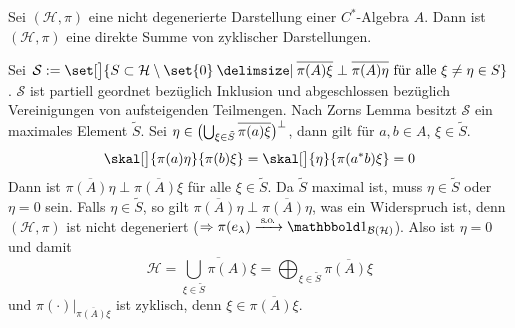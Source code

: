 \begin{satz}[{name=[Darstellung als direkte Summe]}]
	Sei $(\mathcal{H},\pi)$ eine nicht degenerierte Darstellung einer $C^*$-Algebra $A$.
	Dann ist $(\mathcal{H},\pi)$ eine direkte Summe von zyklischer Darstellungen.
\end{satz}
\begin{beweis}
	Sei $\mathcal{S} := \set[\big]{S \subset \mathcal{H}\setminus \set{0} \given {\overline{\pi(A) \xi}} \perp {\overline{\pi(A)\eta}} \text{ für alle }\xi \neq \eta \in S }$.
	$\mathcal{S}$ ist partiell geordnet bezüglich Inklusion und abgeschlossen bezüglich Vereinigungen von aufsteigenden Teilmengen.
	Nach Zorns Lemma besitzt $\mathcal{S}$ ein maximales Element $\tilde{S}$.
	Sei $\eta \in \enbrace[\big]{\bigcup_{\xi \in \tilde{S}} \overline{\pi(a)\xi}}^\bot$, dann gilt für $a,b \in A$, $\xi \in \tilde{S}$.
	\[
		\skal[\big]{\pi(a) \eta}{\pi(b)\xi} = \skal[\big]{\eta}{ \pi(a^*b)\xi} =0
	\]
	Dann ist $\overline{\pi(A)\eta} \perp \overline{\pi(A)\xi}$ für alle $\xi \in \tilde{S}$.
	Da $\tilde{S}$ maximal ist, muss $\eta \in \tilde{S}$ oder $\eta=0$ sein.
	Falls $\eta \in \tilde{S}$, so gilt $\overline{\pi(A)\eta}\perp \overline{\pi(A)\eta}$, was ein Widerspruch ist, denn $(\mathcal{H},\pi)$ ist nicht degeneriert ($\Rightarrow  \pi(e_\lambda)\grenzw{\so}\ind_{\mathcal{B}(\mathcal{H})}$).
	Also ist $\eta=0$ und damit
	\[
		\mathcal{H}= \overline{\bigcup_{\xi \in \tilde{S}} \pi(A)\xi} = \bigoplus_{\xi \in \tilde{S}} \overline{\pi(A)\xi}
	\]
	und $\pi(\cdot )\big|_{\overline{\pi(A)\xi}}$ ist zyklisch, denn $\xi \in \overline{\pi(A)\xi}$.
\end{beweis}

